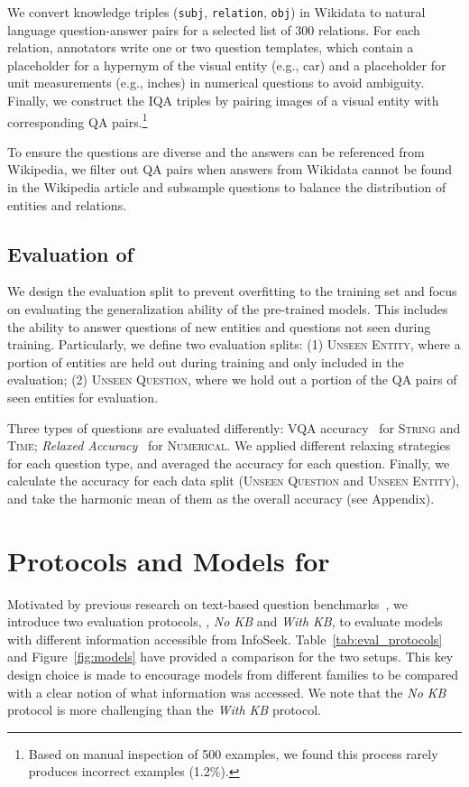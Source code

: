 \documentclass[11pt]{article}
\begin{document}
We convert knowledge triples ({\small \texttt{subj}, \texttt{relation}, \texttt{obj}}{}) in Wikidata to natural language question-answer pairs for a selected list of 300 relations. For each relation, annotators write one or two question templates, which contain a placeholder for a hypernym of the visual entity (e.g., car) and a placeholder for unit measurements (e.g., inches) in numerical questions to avoid ambiguity. 
Finally, we construct the IQA triples by pairing images of a visual entity with corresponding QA pairs.\footnote{Based on manual inspection of 500 examples, we found this process rarely produces incorrect examples (1.2\%).}

To ensure the questions are diverse and the answers can be referenced from Wikipedia, we filter out QA pairs when answers from Wikidata cannot be found in the Wikipedia article and subsample questions to balance the distribution of entities and relations.


\subsection{Evaluation of \textbf{\ourdataset}}
\label{sec:split}

We design the evaluation split to prevent overfitting to the training set and focus on evaluating the generalization ability of the pre-trained models. This includes the ability to answer questions of new entities and questions not seen during training.
Particularly, we define two evaluation splits: (1) \textsc{Unseen Entity}, where a portion of entities are held out during training and only included in the evaluation; (2) \textsc{Unseen Question}, where we hold out a portion of the QA pairs of seen entities for evaluation. 

\label{sec:metric}
Three types of questions are evaluated differently: VQA accuracy~\cite{balanced_vqa_v2} for \textsc{String} and \textsc{Time}; {\em Relaxed Accuracy}~\cite{methani2020plotqa} for \textsc{Numerical}.
We applied different relaxing strategies for each question type, and averaged the accuracy for each question.
Finally, we calculate the accuracy for each data split (\textsc{Unseen Question} and \textsc{Unseen Entity}), and take the harmonic mean of them as the overall accuracy (see Appendix).
 
\section{Protocols and Models for {\infoseek}}
\label{sec:method}
Motivated by previous research on text-based question benchmarks~\cite{joshi-etal-2017-triviaqa,roberts2020much}, we introduce two evaluation protocols, \ie, \emph{No KB} and \emph{With KB}, to evaluate models with different information accessible from {\sc InfoSeek}.
Table~\ref{tab:eval_protocols} and Figure~\ref{fig:models} have provided a comparison for the two setups.
This key design choice is made to encourage models from different families to be compared with a clear notion of what information was accessed. We note that the \emph{No KB} protocol is more challenging than the \emph{With KB} protocol.
\end{document}
